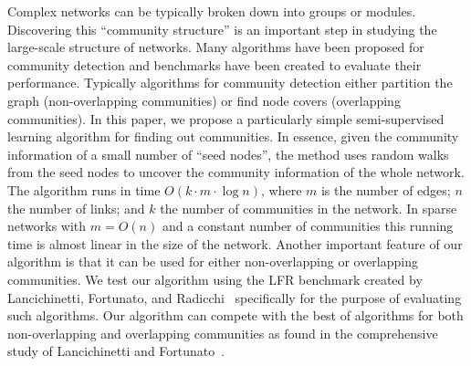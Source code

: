 Complex networks can be typically broken down into groups or modules. Discovering 
this ``community structure'' is an important step in studying the large-scale 
structure of networks. Many algorithms have been proposed for community detection 
and benchmarks have been created to evaluate their performance. Typically algorithms 
for community detection either partition the graph (non-overlapping 
communities) or find node covers (overlapping communities). In this paper, we 
propose a particularly simple semi-supervised learning algorithm for finding 
out communities. In essence, given the community information of a small 
number of ``seed nodes'', the method uses random walks from the seed nodes 
to uncover the community information of the whole network. The algorithm runs 
in time $O(k \cdot m \cdot \log n)$, where $m$ is the number of edges; $n$ 
the number of links; and $k$ the number of communities in the network. 
In sparse networks with $m = O(n)$ and a constant number of communities this 
running time is almost linear in the size of the network. Another important 
feature of our algorithm is that it can be used for either non-overlapping 
or overlapping communities. We test our algorithm using the LFR benchmark 
created by Lancichinetti, Fortunato, and Radicchi~\cite{LFR08} 
specifically for the purpose of evaluating such algorithms. Our algorithm 
can compete with the best of algorithms for both non-overlapping 
and overlapping communities as found in the comprehensive study of 
Lancichinetti and Fortunato~\cite{LF09}.
